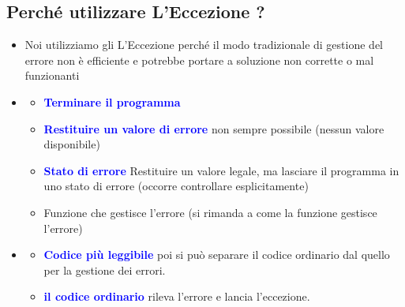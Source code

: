 \subsection{Perché utilizzare L'Eccezione ?}
\begin{itemize}
    \item Noi utilizziamo gli L'Eccezione perché il modo tradizionale di gestione del errore non è efficiente e potrebbe portare a soluzione non corrette o mal funzionanti
    \item \textbf{\textcolor{blue}{}}
    \begin{itemize}
        \item \textbf{\textcolor{blue}{Terminare il programma}}
        \item \textbf{\textcolor{blue}{Restituire un valore di errore}} non sempre possibile (nessun valore disponibile)
        \item \textbf{\textcolor{blue}{Stato di errore}} Restituire un valore legale, ma lasciare il programma in uno stato di errore (occorre controllare esplicitamente)
        \item Funzione che gestisce l’errore (si rimanda a come la funzione gestisce l’errore)
    \end{itemize}
     \item \textbf{\textcolor{blue}{}}
    \begin{itemize}
       \item \textbf{\textcolor{blue}{Codice più leggibile}} poi si può separare il codice ordinario dal quello per la gestione dei errori.
       \item  \textbf{\textcolor{blue}{il codice ordinario}} rileva l'errore e lancia l'eccezione.
    \end{itemize}
\end{itemize}

